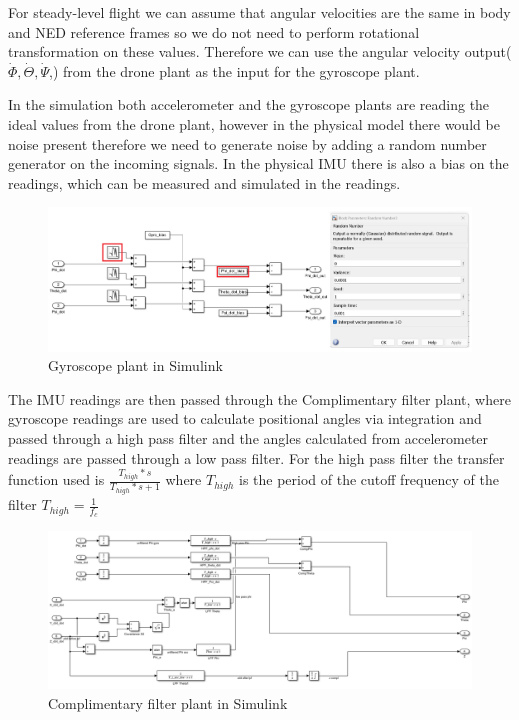 For steady-level flight we can assume that angular velocities are the same in body and NED reference frames so we do not need to perform rotational transformation on these values. Therefore we can use the angular velocity output($\dot{\Phi}, \dot{\Theta}, \dot{\Psi}$,) from the drone plant as the input for the gyroscope plant. 

In the simulation both accelerometer and the gyroscope plants are reading the ideal values from the drone plant, however in the physical model there would be noise present therefore we need to generate noise by adding a random number generator on the incoming signals. In the physical IMU there is also a bias on the readings, which can be measured and simulated in the readings.

\begin{figure}[H]
    \begin{center}
    \includegraphics[scale = 0.45]{pictures/IMU/gyro_plant_nr_genrator.png}
    \end{center}
    \caption{Gyroscope plant in Simulink}
    \label{fig:my_label}
\end{figure}

The IMU readings are then passed through the Complimentary filter plant, where gyroscope readings are used to calculate positional angles via integration and passed through a high pass filter and the angles calculated from accelerometer readings are passed through a low pass filter. For the high pass filter the transfer function used is $\frac{T_{high}*s}{T_{high}*s+1}$ where $T_{high}$ is the period of the cutoff frequency of the filter $T_{high}=\frac{1}{f_c}$

\begin{figure}[H]
    \begin{center}
    \includegraphics[scale = 0.55]{pictures/IMU/Complimentary_filter_plant.png}
    \end{center}
    \caption{Complimentary filter plant in Simulink}
    \label{fig:my_label}
\end{figure}

